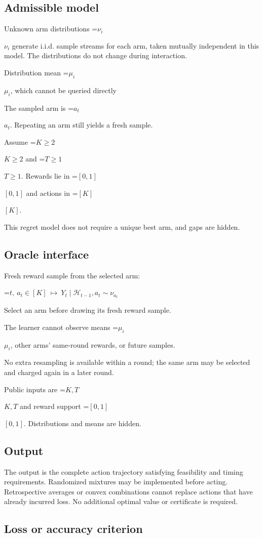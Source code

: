 \documentclass[10pt,a4paper]{article}
\newcommand{\AtlasMath}[1]{\par\begingroup\centering\setbox0=\hbox{$\displaystyle #1$}\ifdim\wd0>1.4\linewidth\typeout{ATLAS WIDE FORMULA: \the\wd0}\fi\ifdim\wd0>\linewidth\resizebox{\linewidth}{!}{\box0}\else\box0\fi\par\endgroup}
\newcommand{\AtlasInlineMath}[1]{\begingroup\setbox0=\hbox{$#1$}\ifdim\wd0>.4\linewidth\endgroup\AtlasMath{#1}\else\endgroup$#1$\fi}
\begin{document}
\subsection{Admissible model}
Unknown arm distributions \AtlasInlineMath{\nu_i} generate i.i.d. sample streams for each arm, taken mutually independent in this model. The distributions do not change during interaction.

Distribution mean \AtlasInlineMath{\mu_i}, which cannot be queried directly

The sampled arm is \AtlasInlineMath{a_t}. Repeating an arm still yields a fresh sample.

Assume \AtlasInlineMath{K\ge2} and \AtlasInlineMath{T\ge1}. Rewards lie in \AtlasInlineMath{[0,1]} and actions in \AtlasInlineMath{[K]}.

This regret model does not require a unique best arm, and gaps are hidden.

\subsection{Oracle interface}
Fresh reward sample from the selected arm:


\AtlasMath{t,\ a_t\in[K]\ \longmapsto\ Y_t\mid\mathcal{H}_{t-1},a_t\sim\nu_{a_t}}


Select an arm before drawing its fresh reward sample.

The learner cannot observe means \AtlasInlineMath{\mu_i}, other arms' same-round rewards, or future samples.

No extra resampling is available within a round; the same arm may be selected and charged again in a later round.

Public inputs are \AtlasInlineMath{K,T} and reward support \AtlasInlineMath{[0,1]}. Distributions and means are hidden.

\subsection{Output}
The output is the complete action trajectory satisfying feasibility and timing requirements. Randomized mixtures may be implemented before acting. Retrospective averages or convex combinations cannot replace actions that have already incurred loss. No additional optimal value or certificate is required.

\subsection{Loss or accuracy criterion}
\end{document}
